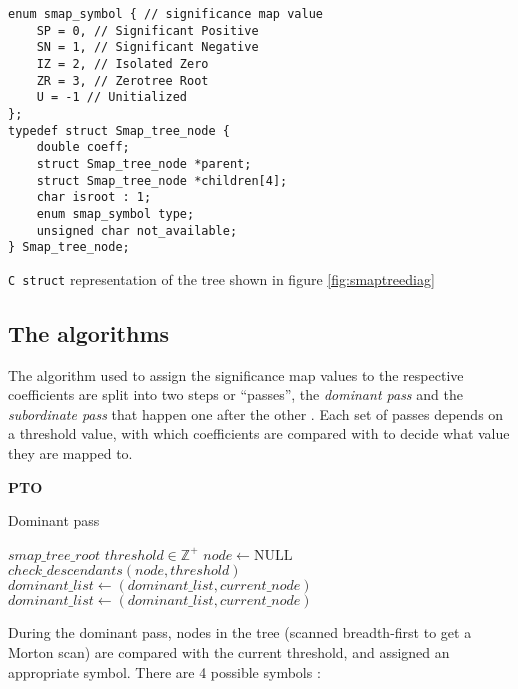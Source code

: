 \documentclass[./A14_Report.tex]{subfiles}
\begin{document}
\begin{code}
\begin{verbatim}
enum smap_symbol { // significance map value
    SP = 0, // Significant Positive
    SN = 1, // Significant Negative
    IZ = 2, // Isolated Zero
    ZR = 3, // Zerotree Root
    U = -1 // Unitialized
};
typedef struct Smap_tree_node {
    double coeff;
    struct Smap_tree_node *parent;
    struct Smap_tree_node *children[4];
    char isroot : 1;
    enum smap_symbol type;
    unsigned char not_available;
} Smap_tree_node;
\end{verbatim}
\caption{\texttt{C struct} representation of the tree shown in figure \ref{fig:smaptreediag} \cite{libezw}}
    \label{code:sbtreedef}
\end{code}

\subsection{The algorithms}
The algorithm used to assign the significance map values to the respective
coefficients are split into two steps or ``passes'', the \textit{dominant pass}
and the \textit{subordinate pass} that happen one after the other \cite{shap1993}. Each set of
passes depends on a threshold value, with which coefficients are compared with
to decide what value they are mapped to.
\par
\textbf{PTO}

\begin{algorithm}[H]
    \caption{Dominant pass}
    \label{alg:dompass}
    \begin{algorithmic}
        \Require $smap\_tree\_root$ 
        \Require $threshold \in \mathbb{Z}^+$
        \State $node \gets \text{NULL}$
            \State $check\_descendants(node, threshold)$
                \State $dominant\_list \gets (dominant\_list, current\_node)$
                    \State $dominant\_list \gets (dominant\_list, current\_node)$
                \EndIf
            \EndIf
        \EndFor
    \end{algorithmic}
\end{algorithm}

During the dominant pass, nodes in the tree (scanned breadth-first to get a
Morton scan) are compared with the current threshold, and assigned an
appropriate symbol. There are 4 possible symbols \cite{valezw1999}:\\
\end{document}
